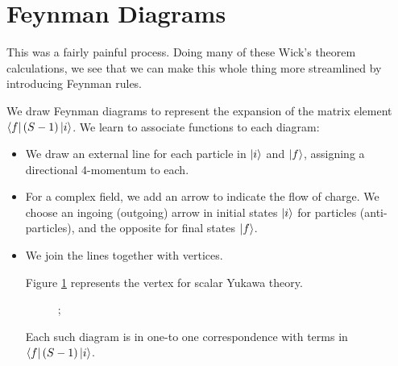 \section{Feynman Diagrams}%
\label{sec:feynman_diagrams}

This was a fairly painful process. Doing many of these Wick's theorem calculations, we see that we can make this whole thing more streamlined by introducing Feynman rules.

We draw Feynman diagrams to represent the expansion of the matrix element $\bra{f}(S-1) \ket{i}$. We learn to associate functions to each diagram:
\begin{itemize}
  \item We draw an external line for each particle in $\ket{i}$ and $\ket{f}$, assigning a directional $4$-momentum to each.
  \item For a complex field, we add an arrow to indicate the flow of charge. We choose an ingoing (outgoing) arrow in initial states $\ket{i}$ for particles (anti-particles), and the opposite for final states $\ket{f}$.
  \item We join the lines together with vertices.
    \begin{example}
      Figure \ref{fig:sytv} represents the vertex for scalar Yukawa theory.
      \begin{figure}[htbp]
        \centering
        ;
        \caption{}
        \label{fig:sytv}
      \end{figure}
    \end{example}
    Each such diagram is in one-to one correspondence with terms in $\bra{f}(S-1)\ket{i}$.
\end{itemize}

